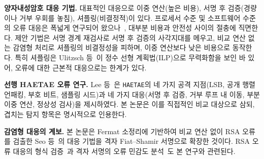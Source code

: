 \textbf{양자내성암호 대응 기법.} 대표적인 대응으로 이중 연산(높은 비용), 서명 후 검증(경량이나
거부 우회를 놓침), 셔플링(비결정적)이 있다. 프로세서 수준 및 소프트웨어 수준의 오류 대응은 폭넓게
연구되어 왔으나~\cite{boulifa2025,barenghi2010}, 대부분 비용과 안전성 사이의 절충에 직면한다.
제안 기법은 서명 경계 재검사로 서명 후 검증의 사각지대를 메우고, 비교 연산 없는 감염형 처리로
셔플링의 비결정성을 피하며, 이중 연산보다 낮은 비용으로 동작한다. 특히 셔플링은 Ulitzsch
등~\cite{ulitzsch2023}이 정수 선형 계획법(ILP)으로 무력화함을 보인 바 있어, 오류에 대한 근본적
대응으로는 한계가 있다.

\textbf{선행 HAETAE 오류 연구.} Lee 등~\cite{lee2026haetae}은 \texttt{HAETAE}의 네 가지 공격
지점(LSB, 공개 행렬 언패킹, 부호 비트, 샘플링 시드)과 네 가지 대응(서명 후 검증, 거부 루프 내
이동, 부분 이중 연산, 정상성 검사)을 제시하였다. 본 논문은 이를 직접적인 비교 대상으로 삼되, 겹치는
탐지 항목은 명시적으로 인용한다.

\textbf{감염형 대응의 계보.} 본 논문은 Fermat 소정리에 기반하여 비교 연산 없이 RSA 오류를 검출한
Seo 등~\cite{seo2013}의 대응 기법을 격자 Fiat--Shamir 서명으로 확장한 것이다. RSA 오류 대응의
형식 검증~\cite{christofi2013}과 격자 서명의 오류 민감도 분석~\cite{bindel2016}도 본 연구와 관련된다.
